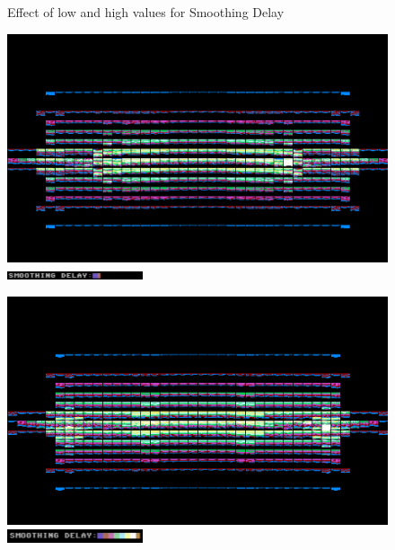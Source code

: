 \begin{figure}[H]
\begin{adjustbox}{width=10.5cm,margin=0cm -2cm}
    \end{adjustbox}
    \caption{Effect of low and high values for Smoothing Delay}
\end{figure}
                                                                           
\begin{figure}[H]
    \centering
    \begin{adjustbox}{width=10.5cm,margin=0cm}
      \includegraphics[width=12cm]{src/delay/pixelhist-0.png}%
    \end{adjustbox}
    \caption{
      \includegraphics[width=4cm]{src/delay/delay-low.png}%
      }
\end{figure}
\begin{figure}[H]
    \centering
    \begin{adjustbox}{width=10.5cm,margin=0cm}
      \includegraphics[width=12cm]{src/delay/pixelhist-1.png}%
    \end{adjustbox}
    \caption{
      \includegraphics[width=4cm]{src/delay/delay-high.png}%
      }
\end{figure}
\clearpage

